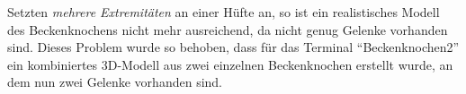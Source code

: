 Setzten \emph{mehrere Extremitäten} an einer Hüfte an, so ist ein realistisches Modell des Beckenknochens nicht mehr ausreichend, da nicht genug Gelenke vorhanden sind. Dieses Problem wurde so behoben, dass für das Terminal "`Beckenknochen2"' ein kombiniertes 3D-Modell aus zwei einzelnen Beckenknochen erstellt wurde, an dem nun zwei Gelenke vorhanden sind.




